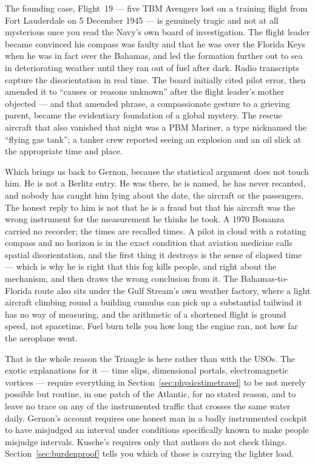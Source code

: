 \begin{funfact}
The founding case, Flight~19 --- five TBM Avengers lost on a training flight from Fort
Lauderdale on 5 December 1945 --- is genuinely tragic and not at all mysterious once you read
the Navy's own board of investigation. The flight leader became convinced his compass was
faulty and that he was over the Florida Keys when he was in fact over the Bahamas, and led
the formation further out to sea in deteriorating weather until they ran out of fuel after
dark. Radio transcripts capture the disorientation in real time. The board initially cited
pilot error, then amended it to ``causes or reasons unknown'' after the flight leader's
mother objected --- and that amended phrase, a compassionate gesture to a grieving parent,
became the evidentiary foundation of a global mystery. The rescue aircraft that also vanished
that night was a PBM Mariner, a type nicknamed the ``flying gas tank''; a tanker crew
reported seeing an explosion and an oil slick at the appropriate time and place.
\end{funfact}

Which brings us back to Gernon, because the statistical argument does not touch him. He is not
a Berlitz entry. He was there, he is named, he has never recanted, and nobody has caught him
lying about the date, the aircraft or the passengers. The honest reply to him is not that he is a
fraud but that his aircraft was the wrong instrument for the measurement he thinks he took. A
1970 Bonanza carried no recorder; the times are recalled times. A pilot in cloud with a rotating
compass and no horizon is in the exact condition that aviation medicine calls spatial
disorientation, and the first thing it destroys is the sense of elapsed time --- which is why he
is right that this fog kills people, and right about the mechanism, and then draws the wrong
conclusion from it. The Bahamas-to-Florida route also sits under the Gulf Stream's own weather
factory, where a light aircraft climbing round a building cumulus can pick up a substantial
tailwind it has no way of measuring, and the arithmetic of a shortened flight is ground speed,
not spacetime. Fuel burn tells you how long the engine ran, not how far the aeroplane went.

That is the whole reason the Triangle is here rather than with the USOs. The exotic explanations
for it --- time slips, dimensional portals, electromagnetic vortices --- require everything in
Section~\ref{sec:physicstimetravel} to be not merely possible but routine, in one patch of the
Atlantic, for no stated reason, and to leave no trace on any of the instrumented traffic that
crosses the same water daily. Gernon's account requires one honest man in a badly instrumented
cockpit to have misjudged an interval under conditions specifically known to make people misjudge
intervals. Kusche's requires only that authors do not check things.
Section~\ref{sec:burdenproof} tells you which of those is carrying the lighter load.

